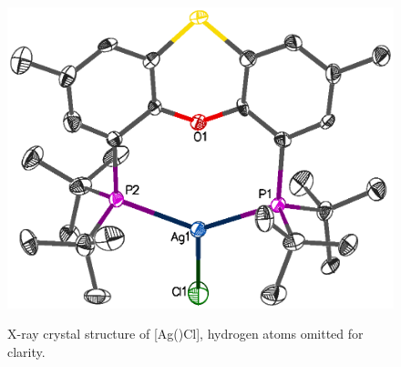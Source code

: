 

\begin{figure}[htbp]
\begin{center}
\vspace{0.5cm}
\includegraphics[scale=0.8]{../Figures/Crystalthixantphossilverchloride.eps}
\caption[X-ray crystal structure of [Ag(\tButhixantphos)Cl{]}]{X-ray crystal structure of [Ag(\tButhixantphos)Cl], hydrogen atoms omitted for clarity.}
\vspace{0.2cm}
\label{Crystalthixantphossilverchloride}
\vspace{0.2cm}
\end{center}
\end{figure}
\vspace{0.2cm}


